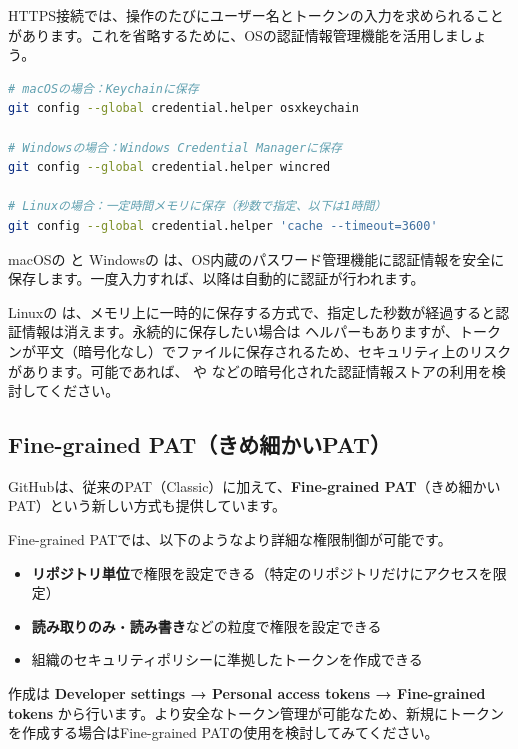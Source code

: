 HTTPS接続では、操作のたびにユーザー名とトークンの入力を求められることがあります。これを省略するために、OSの認証情報管理機能を活用しましょう。

\begin{lstlisting}[language=bash]
# macOSの場合：Keychainに保存
git config --global credential.helper osxkeychain

# Windowsの場合：Windows Credential Managerに保存
git config --global credential.helper wincred

# Linuxの場合：一定時間メモリに保存（秒数で指定、以下は1時間）
git config --global credential.helper 'cache --timeout=3600'
\end{lstlisting}

macOSの  と Windowsの  は、OS内蔵のパスワード管理機能に認証情報を安全に保存します。一度入力すれば、以降は自動的に認証が行われます。

Linuxの  は、メモリ上に一時的に保存する方式で、指定した秒数が経過すると認証情報は消えます。永続的に保存したい場合は  ヘルパーもありますが、トークンが平文（暗号化なし）でファイルに保存されるため、セキュリティ上のリスクがあります。可能であれば、 や  などの暗号化された認証情報ストアの利用を検討してください。

\subsection{Fine-grained PAT（きめ細かいPAT）}

GitHubは、従来のPAT（Classic）に加えて、\textbf{Fine-grained PAT}（きめ細かいPAT）という新しい方式も提供しています。

Fine-grained PATでは、以下のようなより詳細な権限制御が可能です。

\begin{itemize}
  \item \textbf{リポジトリ単位}で権限を設定できる（特定のリポジトリだけにアクセスを限定）
  \item \textbf{読み取りのみ}・\textbf{読み書き}などの粒度で権限を設定できる
  \item 組織のセキュリティポリシーに準拠したトークンを作成できる
\end{itemize}

作成は \textbf{Developer settings → Personal access tokens → Fine-grained tokens} から行います。より安全なトークン管理が可能なため、新規にトークンを作成する場合はFine-grained PATの使用を検討してみてください。

